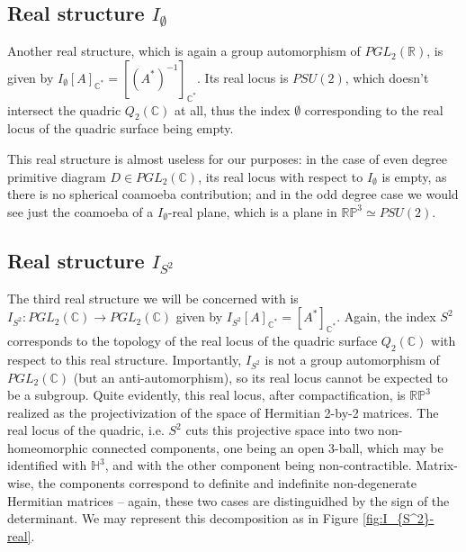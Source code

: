 \documentclass[pdflatex,sn-mathphys-num]{sn-jnl}%
\theoremstyle{thmstyleone}%
\theoremstyle{thmstyletwo}%
\theoremstyle{thmstylethree}%
\newcommand{\R}{\mathbb{R}}
\newcommand{\RP}{\mathbb{R}\mathbb{P}}
\newcommand{\C}{\mathbb{C}}
\begin{document}

\subsection{Real structure $I_{\emptyset}$}
Another real structure, which is again a group automorphism of $PGL_2(\R)$, is given by
$I_{\emptyset}[A]_{\C^*}=[(A^*)^{-1}]_{\C^*}.$ Its real locus is $PSU(2)$, which doesn't intersect the quadric $Q_2(\C)$ at all, thus the index $\emptyset$ corresponding to the real locus of the quadric surface being empty.

This real structure is almost useless for our purposes: in the case of even degree
primitive diagram $D\in PGL_2(\C)$, its real locus with respect to $I_\emptyset$ is empty, as there is no spherical coamoeba contribution; and in the odd degree case we would see just the coamoeba of a $I_\emptyset$-real plane,
which is a plane in $\RP^3\simeq PSU(2)$.


\subsection{Real structure $I_{S^2}$}
The third real structure we will be concerned with is $I_{S^2}: PGL_2(\C) \longrightarrow PGL_2(\C)$ given by $I_{S^2}[A]_{\C^*} = [A^*]_{\C^*}$. Again, the index $S^2$ corresponds to the topology of the real locus of the quadric surface $Q_2(\C)$ with respect to this real structure. Importantly, $I_{S^2}$ is not a group automorphism of $PGL_2(\C)$ (but an anti-automorphism), so its real locus cannot be expected to be a subgroup. Quite evidently, this real locus, after compactification, is $\RP^3$ realized as the projectivization of the space of Hermitian 2-by-2 matrices. The real locus of the quadric, i.e. $S^2$ cuts this projective space into two non-homeomorphic connected components, one being an open 3-ball, which may be identified with $\mathbb{H}^3$, and with the other component being non-contractible. Matrix-wise, the components correspond to definite and indefinite non-degenerate Hermitian matrices -- again, these two cases are distinguidhed by the sign of the determinant. We may represent this decomposition as in Figure \ref{fig:I_{S^2}-real}.
\end{document}

